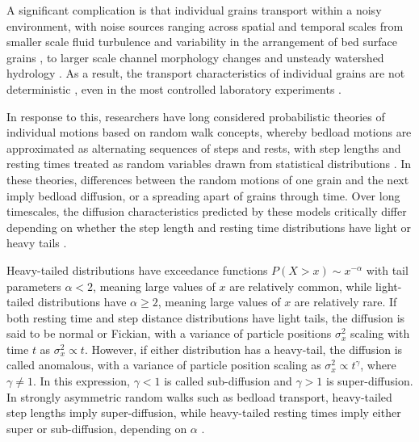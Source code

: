\documentclass[draft]{agujournal2018}
\begin{document}
A significant complication is that individual grains transport within a noisy environment, with noise sources ranging across spatial and temporal scales from smaller scale fluid turbulence \citep{Celik2014} and variability in the arrangement of bed surface grains \citep{Gordon1972}, to larger scale channel morphology changes \citep{Hassan2017} and unsteady watershed hydrology \citep{Phillips2013}.
As a result, the transport characteristics of individual grains are not deterministic \citep[e.g.][]{Einstein1937}, even in the most controlled laboratory experiments \citep[e.g.][]{Charru2004, Bohm2004, Fathel2015, Heyman2016}.

In response to this, researchers have long considered probabilistic theories of individual motions based on random walk concepts, whereby bedload motions are approximated as alternating sequences of steps and rests, with step lengths and resting times treated as random variables drawn from statistical distributions \citep{Einstein1937, Yano1969, Nakagawa1976, Hassan1991, Bradley2012}.
In these theories, differences between the random motions of one grain and the next imply bedload diffusion, or a spreading apart of grains through time.
Over long timescales, the diffusion characteristics predicted by these models critically differ depending on whether the step length and resting time distributions have light or heavy tails \citep[e.g.][]{Bradley2017}.

Heavy-tailed distributions have exceedance functions $P(X>x) \sim x^{-\alpha}$ with tail parameters $\alpha < 2$, meaning large values of $x$ are relatively common, while light-tailed distributions have $\alpha \geq 2$, meaning large values of $x$ are relatively rare.
If both resting time and step distance distributions have light tails, the diffusion is said to be normal or Fickian, with a variance of particle positions $\sigma_x^2$
scaling with time $t$ as $\sigma_x^2 \propto t$.
However, if either distribution has a heavy-tail, the diffusion is called anomalous, with a variance of particle position scaling as $\sigma_x^2 \propto t^\gamma$, where $\gamma\neq 1$.
In this expression, $\gamma <1$ is called sub-diffusion and $\gamma > 1$ is super-diffusion.
In strongly asymmetric random walks such as bedload transport, heavy-tailed step lengths imply super-diffusion, while heavy-tailed resting times imply either super or sub-diffusion, depending on $\alpha$ \citep{Weeks1996, Weeks1998}.
\end{document}
